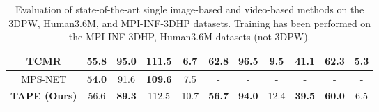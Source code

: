 \documentclass[runningheads]{llncs}
\begin{document}
\begin{table*}[t]
\begin{adjustbox}{width={\textwidth},totalheight={\textheight},keepaspectratio}
\begin{tabular}{|c|cccc|ccc|ccc|}
TCMR                    & \multicolumn{1}{c|}{55.8}          & \multicolumn{1}{c|}{95.0}          & \multicolumn{1}{c|}{111.5}          & \textbf{6.7} & \multicolumn{1}{c|}{62.8}          & \multicolumn{1}{c|}{96.5}          & \textbf{9.5}       & \multicolumn{1}{c|}{41.1}          & \multicolumn{1}{c|}{62.3}          & \textbf{5.3}       \\ \hline
MPS-NET                 & \multicolumn{1}{c|}{\textbf{54.0}} & \multicolumn{1}{c|}{91.6}          & \multicolumn{1}{c|}{\textbf{109.6}}          & 7.5          & \multicolumn{1}{c|}{-}             & \multicolumn{1}{c|}{-}             & -         & \multicolumn{1}{c|}{-}             & \multicolumn{1}{c|}{-}             & -         \\ \hline
\textbf{TAPE (Ours)}                 & \multicolumn{1}{c|}{56.6}          & \multicolumn{1}{c|}{\textbf{89.3}} & \multicolumn{1}{c|}{112.5} & 10.7         & \multicolumn{1}{c|}{\textbf{56.7}} & \multicolumn{1}{c|}{\textbf{94.0}} & 12.4      & \multicolumn{1}{c|}{\textbf{39.5}} & \multicolumn{1}{c|}{\textbf{60.0}} & 6.5      \\ \hline
\end{tabular}
\end{adjustbox}
\caption{Evaluation of state-of-the-art single image-based and
video-based methods on the 3DPW, Human3.6M, and MPI-INF-3DHP datasets. Training has been performed on the MPI-INF-3DHP, Human3.6M datasets (not 3DPW).}
\label{wo3dpw}

\end{table*}
\end{document}
